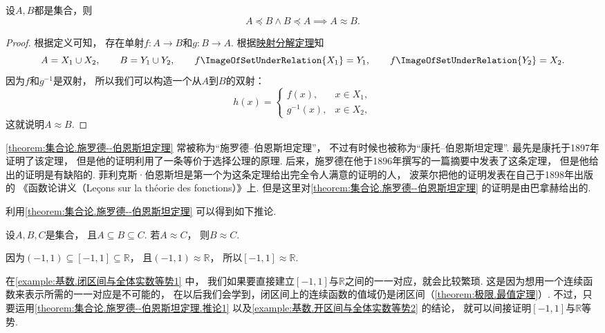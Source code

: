 \begin{theorem}\label{theorem:集合论.施罗德--伯恩斯坦定理}
设\(A,B\)都是集合，则\[
	A \preceq B \land B \preceq A \implies A \approx B.
\]
\begin{proof}
根据定义可知，
存在单射\(f\colon A \to B\)和\(g\colon B \to A\).
根据\hyperref[theorem:基数.集合在映射下的分解]{映射分解定理}知\[
	A = X_1 \cup X_2, \qquad
	B = Y_1 \cup Y_2, \qquad
	f\ImageOfSetUnderRelation{X_1} = Y_1, \qquad
	f\ImageOfSetUnderRelation{Y_2} = X_2.
\]
因为\(f\)和\(g^{-1}\)是双射，
所以我们可以构造一个从\(A\)到\(B\)的双射：\[
	h(x) = \left\{ \begin{array}{cl}
		f(x), & x \in X_1, \\
		g^{-1}(x), & x \in X_2,
	\end{array} \right.
\]
这就说明\(A \approx B\).
\end{proof}
\end{theorem}
\cref{theorem:集合论.施罗德--伯恩斯坦定理}
常被称为“施罗德--伯恩斯坦定理”，
不过有时候也被称为“康托--伯恩斯坦定理”.
最先是康托于1897年证明了该定理，
但是他的证明利用了一条等价于选择公理的原理.
后来，施罗德在他于1896年撰写的一篇摘要中发表了这条定理，
但是他给出的证明是有缺陷的.
菲利克斯·伯恩斯坦是第一个为这条定理给出完全令人满意的证明的人，
波莱尔把他的证明发表在自己于1898年出版的
《函数论讲义（Le\c{c}ons sur la th\'eorie des fonctions）》上.
但是这里对\cref{theorem:集合论.施罗德--伯恩斯坦定理} 的证明是由巴拿赫给出的.

利用\cref{theorem:集合论.施罗德--伯恩斯坦定理} 可以得到如下推论.
\begin{corollary}\label{theorem:集合论.施罗德--伯恩斯坦定理.推论1}
设\(A,B,C\)是集合，
且\(A \subseteq B \subseteq C\).
若\(A \approx C\)，
则\(B \approx C\).
\end{corollary}

\begin{example}\label{example:基数.闭区间与全体实数等势1}
因为\((-1,1)\subseteq[-1,1]\subseteq\mathbb{R}\)，
且\((-1,1)\approx\mathbb{R}\)，
所以\([-1,1]\approx\mathbb{R}\).
\end{example}
在\cref{example:基数.闭区间与全体实数等势1} 中，
我们如果要直接建立\([-1,1]\)与\(\mathbb{R}\)之间的一一对应，就会比较繁琐.
这是因为想用一个连续函数来表示所需的一一对应是不可能的，
在以后我们会学到，闭区间上的连续函数的值域仍是闭区间（\cref{theorem:极限.最值定理}）.
不过，只要运用\cref{theorem:集合论.施罗德--伯恩斯坦定理.推论1}
以及\cref{example:基数.开区间与全体实数等势2} 的结论，
就可以间接证明\([-1,1]\)与\(\mathbb{R}\)等势.

